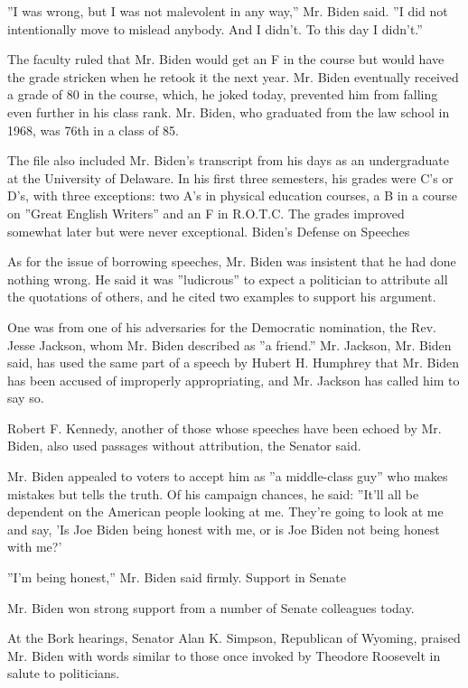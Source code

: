 ''I was wrong, but I was not malevolent in any way,'' Mr. Biden said.
''I did not intentionally move to mislead anybody. And I didn't. To this
day I didn't.''

The faculty ruled that Mr. Biden would get an F in the course but would
have the grade stricken when he retook it the next year. Mr. Biden
eventually received a grade of 80 in the course, which, he joked today,
prevented him from falling even further in his class rank. Mr. Biden,
who graduated from the law school in 1968, was 76th in a class of 85.

The file also included Mr. Biden's transcript from his days as an
undergraduate at the University of Delaware. In his first three
semesters, his grades were C's or D's, with three exceptions: two A's in
physical education courses, a B in a course on ''Great English Writers''
and an F in R.O.T.C. The grades improved somewhat later but were never
exceptional. Biden's Defense on Speeches

As for the issue of borrowing speeches, Mr. Biden was insistent that he
had done nothing wrong. He said it was ''ludicrous'' to expect a
politician to attribute all the quotations of others, and he cited two
examples to support his argument.

One was from one of his adversaries for the Democratic nomination, the
Rev. Jesse Jackson, whom Mr. Biden described as ''a friend.'' Mr.
Jackson, Mr. Biden said, has used the same part of a speech by Hubert H.
Humphrey that Mr. Biden has been accused of improperly appropriating,
and Mr. Jackson has called him to say so.

Robert F. Kennedy, another of those whose speeches have been echoed by
Mr. Biden, also used passages without attribution, the Senator said.

Mr. Biden appealed to voters to accept him as ''a middle-class guy'' who
makes mistakes but tells the truth. Of his campaign chances, he said:
''It'll all be dependent on the American people looking at me. They're
going to look at me and say, 'Is Joe Biden being honest with me, or is
Joe Biden not being honest with me?'

''I'm being honest,'' Mr. Biden said firmly. Support in Senate

Mr. Biden won strong support from a number of Senate colleagues today.

At the Bork hearings, Senator Alan K. Simpson, Republican of Wyoming,
praised Mr. Biden with words similar to those once invoked by Theodore
Roosevelt in salute to politicians.


